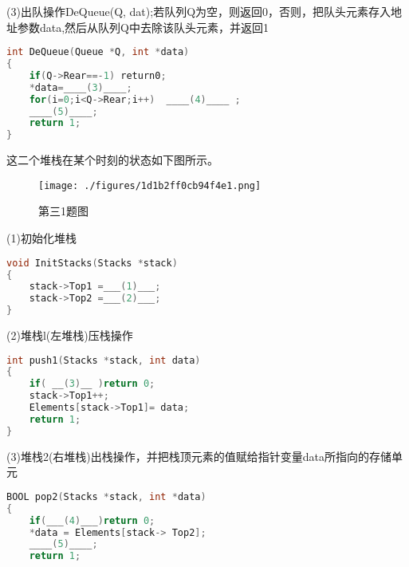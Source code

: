 (3)出队操作DeQueue(Q, dat);若队列Q为空，则返回0，否则，把队头元素存入地址参数data,然后从队列Q中去除该队头元素，并返回1
\begin{lstlisting}[language=cpp]
int DeQueue(Queue *Q, int *data)
{
    if(Q->Rear==-1) return0;
    *data=____(3)____;
    for(i=0;i<Q->Rear;i++)  ____(4)____ ;
    ____(5)____;
    return 1;
}
\end{lstlisting}
这二个堆栈在某个时刻的状态如下图所示。
\begin{figure}[ht]
\centering
\texttt{[image: ./figures/1d1b2ff0cb94f4e1.png]}
\caption{第三1题图} \label{fig_SYDS12_4}
\end{figure}
(1)初始化堆栈
\begin{lstlisting}[language=cpp]
void InitStacks(Stacks *stack)
{
    stack->Top1 =___(1)___;
    stack->Top2 =___(2)___;
}
\end{lstlisting}
(2)堆栈l(左堆栈)压栈操作
\begin{lstlisting}[language=cpp]
int push1(Stacks *stack, int data)
{
    if( __(3)__ )return 0;
    stack->Top1++;
    Elements[stack->Top1]= data;
    return 1;
}
\end{lstlisting}
(3)堆栈2(右堆栈)出栈操作，并把栈顶元素的值赋给指针变量data所指向的存储单元
\begin{lstlisting}[language=cpp]
BOOL pop2(Stacks *stack, int *data)
{
    if(___(4)___)return 0;
    *data = Elements[stack-> Top2];
    ____(5)____;
    return 1;
\end{lstlisting}
